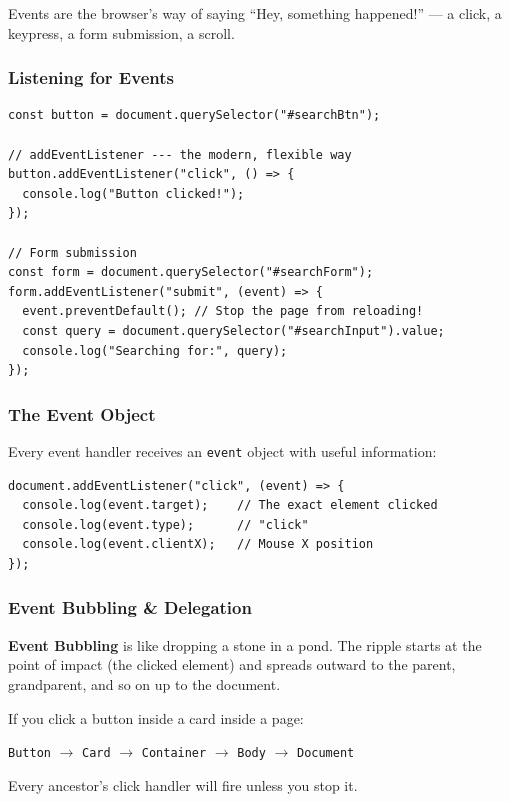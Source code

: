 \documentclass[12pt]{article}
\begin{document}
Events are the browser's way of saying ``Hey, something happened!'' --- a click, a keypress, a form submission, a scroll.

\subsubsection*{Listening for Events}

\begin{lstlisting}
const button = document.querySelector("#searchBtn");

// addEventListener --- the modern, flexible way
button.addEventListener("click", () => {
  console.log("Button clicked!");
});

// Form submission
const form = document.querySelector("#searchForm");
form.addEventListener("submit", (event) => {
  event.preventDefault(); // Stop the page from reloading!
  const query = document.querySelector("#searchInput").value;
  console.log("Searching for:", query);
});
\end{lstlisting}

\subsubsection*{The Event Object}

Every event handler receives an \texttt{event} object with useful information:

\begin{lstlisting}
document.addEventListener("click", (event) => {
  console.log(event.target);    // The exact element clicked
  console.log(event.type);      // "click"
  console.log(event.clientX);   // Mouse X position
});
\end{lstlisting}

\subsubsection*{Event Bubbling \& Delegation}

\begin{analogybox}
\textbf{Event Bubbling} is like dropping a stone in a pond. The ripple starts at the point of impact (the clicked element) and spreads outward to the parent, grandparent, and so on up to the document.

If you click a button inside a card inside a page:

\texttt{Button} $\rightarrow$ \texttt{Card} $\rightarrow$ \texttt{Container} $\rightarrow$ \texttt{Body} $\rightarrow$ \texttt{Document}

Every ancestor's click handler will fire unless you stop it.
\end{analogybox}
\end{document}
